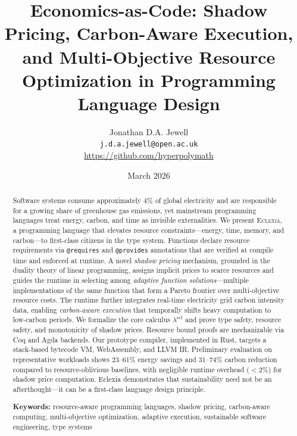 \documentclass[11pt,a4paper]{article}
\title{%
  \textbf{Economics-as-Code: Shadow Pricing, Carbon-Aware Execution, and
  Multi-Objective Resource Optimization in Programming Language Design}
}
\author{%
  Jonathan D.A. Jewell \\
  \texttt{j.d.a.jewell@open.ac.uk} \\
  \url{https://github.com/hyperpolymath}
}
\date{March 2026}
\begin{document}
\maketitle

\begin{abstract}
Software systems consume approximately 4\% of global electricity and are
responsible for a growing share of greenhouse gas emissions, yet mainstream
programming languages treat energy, carbon, and time as invisible externalities.
We present \textsc{Eclexia}, a programming language that elevates resource
constraints---energy, time, memory, and carbon---to first-class citizens in the
type system.  Functions declare resource requirements via \texttt{@requires} and
\texttt{@provides} annotations that are verified at compile time and enforced at
runtime.  A novel \emph{shadow pricing} mechanism, grounded in the duality
theory of linear programming, assigns implicit prices to scarce resources and
guides the runtime in selecting among \emph{adaptive function solutions}---multiple
implementations of the same function that form a Pareto frontier over
multi-objective resource costs.  The runtime further integrates real-time
electricity grid carbon intensity data, enabling \emph{carbon-aware execution}
that temporally shifts heavy computation to low-carbon periods.  We formalize
the core calculus $\lambda^{\mathrm{ecl}}$ and prove type safety, resource
safety, and monotonicity of shadow prices.  Resource bound proofs are
mechanizable via Coq and Agda backends.  Our prototype compiler, implemented in
Rust, targets a stack-based bytecode VM, WebAssembly, and LLVM IR.
Preliminary evaluation on representative workloads shows $23$--$61\%$
energy savings and $31$--$74\%$ carbon reduction compared to
resource-oblivious baselines, with negligible runtime overhead ($<2\%$) for
shadow price computation.  Eclexia demonstrates that sustainability need not be
an afterthought---it can be a first-class language design principle.

\medskip
\noindent
\textbf{Keywords:} resource-aware programming languages, shadow pricing,
carbon-aware computing, multi-objective optimization, adaptive execution,
sustainable software engineering, type systems
\end{abstract}


\end{document}
